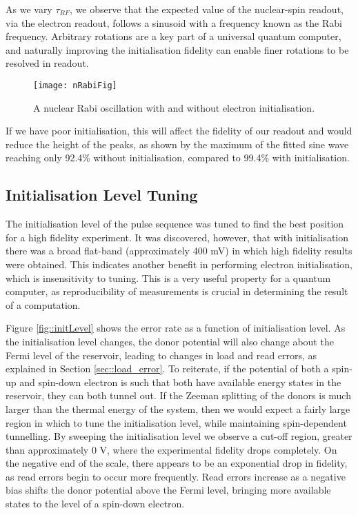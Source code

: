 	
	As we vary $\tau_{RF}$, we observe that the expected value of the nuclear-spin readout, via the electron readout, follows a sinusoid with a frequency known as the Rabi frequency. Arbitrary rotations are a key part of a universal quantum computer, and naturally improving the initialisation fidelity can enable finer rotations to be resolved in readout.
	
	\begin{figure}[H]
		\centering
		\texttt{[image: nRabiFig]}
		\caption{A nuclear Rabi oscillation with and without electron initialisation.}
		\label{fig::nuclear_rabi}
	\end{figure}
	
	If we have poor initialisation, this will affect the fidelity of our readout and would reduce the height of the peaks, as shown by the maximum of the fitted sine wave reaching only 92.4\% without initialisation, compared to 99.4\% with initialisation.

\subsection{Initialisation Level Tuning}
	The initialisation level of the pulse sequence was tuned to find the best position for a high fidelity experiment. It was discovered, however, that with initialisation there was a broad  flat-band (approximately 400 mV) in which high fidelity results were obtained. This indicates another benefit in performing electron initialisation, which is insensitivity to tuning. This is a very useful property for a quantum computer, as reproducibility of measurements is crucial in determining the result of a computation.
	
	Figure \ref{fig::initLevel} shows the error rate as a function of initialisation level. As the initialisation level changes, the donor potential will also change about the Fermi level of the reservoir, leading to changes in load and read errors, as explained in Section \ref{sec::load_error}. To reiterate, if the potential of both a spin-up and spin-down electron is such that both have available energy states in the reservoir, they can both tunnel out. If the Zeeman splitting of the donors is much larger than the thermal energy of the system, then we would expect a fairly large region in which to tune the initialisation level, while maintaining spin-dependent tunnelling. 
	By sweeping the initialisation level we observe a cut-off region, greater than approximately 0 V, where the experimental fidelity drops completely. On the negative end of the scale, there appears to be an exponential drop in fidelity, as read errors begin to occur more frequently. Read errors increase as a negative bias shifts the donor potential above the Fermi level, bringing more available states to the level of a spin-down electron.
	

